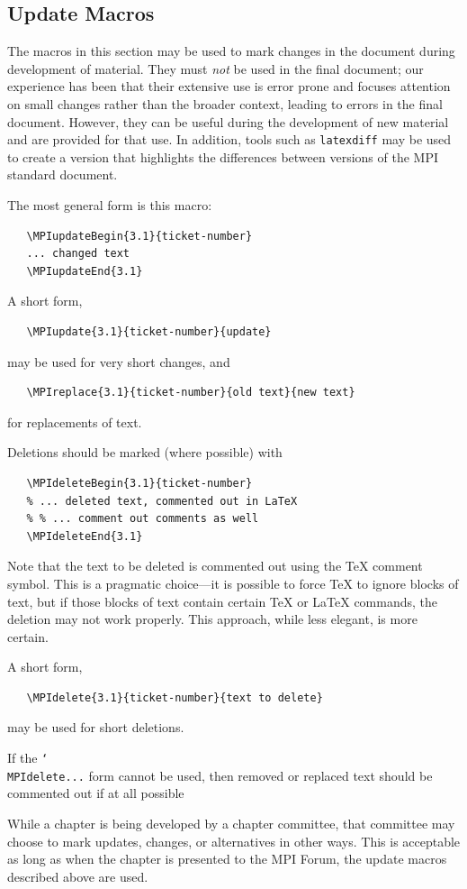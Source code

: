 \documentclass[letterpaper,twoside,11pt,fleqn]{article}
\def\cmd#1{\texttt{\char`\\#1}}
\def\MPI/{\textsf{MPI}}    %
\begin{document}
\subsection{Update Macros}
\label{sec:update-macros}
The macros in this section may be used to mark changes in the
document during development of material.  They must \emph{not} be used in the
final document; our experience has been that their extensive use is error
prone and focuses attention on small changes rather than the broader context,
leading to errors in the final document.  However, they can be useful during
the development of new material and are provided for that use.  In addition,
tools such as \texttt{latexdiff} may be used to create a version that
highlights the differences between versions of the \MPI/ standard document.

The most general form is this macro:
\begin{verbatim}
   \MPIupdateBegin{3.1}{ticket-number}
   ... changed text
   \MPIupdateEnd{3.1}
\end{verbatim}
A short form,
\begin{verbatim}
   \MPIupdate{3.1}{ticket-number}{update}
\end{verbatim}
may be used for very short changes, and
\begin{verbatim}
   \MPIreplace{3.1}{ticket-number}{old text}{new text}
\end{verbatim}
for replacements of text.

Deletions should be marked (where possible) with
\begin{verbatim}
   \MPIdeleteBegin{3.1}{ticket-number}
   % ... deleted text, commented out in LaTeX
   % % ... comment out comments as well
   \MPIdeleteEnd{3.1}
\end{verbatim}
Note that the text to be deleted is commented out using the TeX
comment symbol.  This is a pragmatic choice---it is possible to force
TeX to ignore blocks of text, but if those blocks of text contain
certain TeX or LaTeX commands, the deletion may not work properly.
This approach, while less elegant, is more certain.

A short form,
\begin{verbatim}
   \MPIdelete{3.1}{ticket-number}{text to delete}
\end{verbatim}
may be used for short deletions.

If the \cmd{MPIdelete...} form cannot be used, then
removed or replaced text should be commented out if at all possible

While a chapter is being developed by a chapter committee, that
committee may choose to mark updates, changes, or alternatives in
other ways.  This is acceptable as long as when the chapter is
presented to the \MPI/ Forum, the update macros described above are
used.
\end{document}
